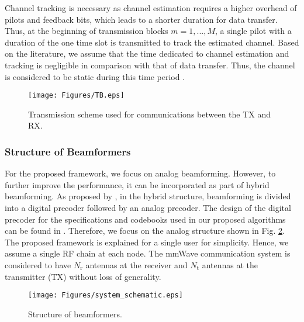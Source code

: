 \documentclass{ieeeaccess}
\begin{document}
Channel tracking is necessary as channel estimation requires a higher overhead of pilots and feedback bits, which leads to a shorter duration for data transfer. Thus, at the beginning of transmission blocks $m=1,...,M$, a single pilot with a duration of the one time slot is transmitted to track the estimated channel. Based on the literature, we assume that the time dedicated to channel estimation and tracking is negligible in comparison with that of data transfer. Thus, the channel is considered to be static during this time period \cite{overlap,RACE}.

\begin{figure}[t!]
\centering
\texttt{[image: Figures/TB.eps]}
\caption{Transmission scheme used for communications between the TX and RX.}
\label{TB}
\end{figure}

\subsubsection{Structure of Beamformers}
For the proposed framework, we focus on analog beamforming. However, to further improve the performance, it can be incorporated as part of hybrid beamforming. As proposed by \cite{n11,n12,n13}, in the hybrid structure, beamforming is divided into a digital precoder followed by an analog precoder. The design of the digital precoder for the specifications and codebooks used in our proposed algorithms can be found in \cite{RH}. Therefore, we focus on the analog structure shown in Fig. \ref{TB2}. The proposed framework is explained for a single user for simplicity. Hence, we assume a single RF chain at each node. The mmWave communication system is considered to have $N_\textrm{r}$ antennas at the receiver and $N_\textrm{t}$ antennas at the transmitter (TX) without loss of generality.

\begin{figure}[t!]
\centering
\texttt{[image: Figures/system\_schematic.eps]}
\caption{Structure of beamformers.}
\label{TB2}
\end{figure}
\end{document}
